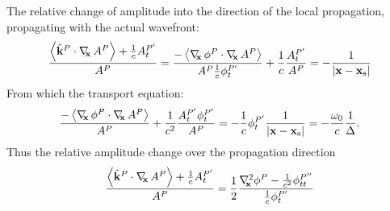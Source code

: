 The relative change of amplitude into the direction of the local propagation, propagating with the actual wavefront:
\begin{equation}
\frac{ \left< \hat{\mathbf{k}}^P \cdot \nabla_{\!\!\mathbf{x}}\, A^P \right>+\frac{1}{c} A^{P'}_t }{A^P}  = \frac{ -\left< \nabla_{\!\!\mathbf{x}}\, \phi^P \cdot \nabla_{\!\!\mathbf{x}}\, A^P \right> }{A^P \frac{1}{c}\phi^{P'}_t } + \frac{1}{c} \frac{A^{P'}_t  }{A^P} = - \frac{1}{|\mathbf{x}-\mathbf{x}_{\mathrm{s}}|}
\end{equation}
From which the transport equation:
\begin{equation}
\frac{ -\left< \nabla_{\!\!\mathbf{x}}\, \phi^P \cdot \nabla_{\!\!\mathbf{x}}\, A^P \right> }{A^P } + \frac{1}{c^2} \frac{A^{P'}_t \phi^{P'}_t }{A^P} = - \frac{1}{c}\phi^{P'}_t \frac{1}{|\mathbf{x}-\mathbf{x}_{\mathrm{s}}|}
= -\frac{\omega_0}{c} \frac{1}{\Delta}.
\end{equation}
Thus the relative amplitude change over the propagation direction 
\begin{equation}
\frac{ \left< \hat{\mathbf{k}}^P \cdot \nabla_{\!\!\mathbf{x}}\, A^P \right>+\frac{1}{c} A^{P'}_t }{A^P}  = \frac{1}{2} \frac{ \nabla^2_{\!\!\mathbf{x}} \phi^P - \frac{1}{c^2} \phi^{P''}_{tt} }{\frac{1}{c}\phi^{P'}_t}
\end{equation}

